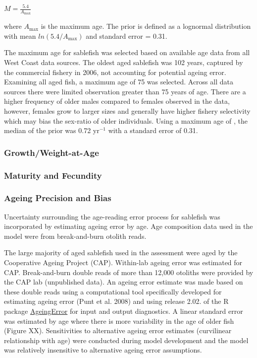 \documentclass[
]{scrartcl}
\begin{document}
\begin{centering}

$M=\frac{5.4}{A_{\text{max}}}$

\end{centering}

\vspace{0.5cm}

where \(A_{\text{max}}\) is the maximum age. The prior is defined as a
lognormal distribution with mean \(ln(5.4/A_{\text{max}})\) and standard
error = 0.31.

The maximum age for sablefish was selected based on available age data
from all West Coast data sources. The oldest aged sablefish was 102
years, captured by the commercial fishery in 2006, not accounting for
potential ageing error. Examining all aged fish, a maximum age of 75 was
selected. Across all data sources there were limited observation greater
than 75 years of age. There are a higher frequency of older males
compared to females observed in the data, however, females grow to
larger sizes and generally have higher fishery selectivity which may
bias the sex-ratio of older individuals. Using a maximum age of , the
median of the prior was 0.72 yr\(^{-1}\) with a standard error of 0.31.

\subsubsection{Growth/Weight-at-Age}\label{growthweight-at-age}

\subsubsection{Maturity and Fecundity}\label{maturity-and-fecundity}

\subsubsection{Ageing Precision and
Bias}\label{ageing-precision-and-bias}

Uncertainty surrounding the age-reading error process for sablefish was
incorporated by estimating ageing error by age. Age composition data
used in the model were from break-and-burn otolith reads.

The large majority of aged sablefish used in the assessment were aged by
the Cooperative Ageing Project (CAP). Within-lab ageing error was
estimated for CAP. Break-and-burn double reads of more than 12,000
otoliths were provided by the CAP lab (unpublished data). An ageing
error estimate was made based on these double reads using a
computational tool specifically developed for estimating ageing error
(Punt et al. 2008) and using release 2.02. of the R package
\href{https://github.com/nwfsc-assess/nwfscAgeingError}{AgeingError} for
input and output diagnostics. A linear standard error was estimated by
age where there is more variability in the age of older fish (Figure
XX). Sensitivities to alternative ageing error estimates (curvilinear
relationship with age) were conducted during model development and the
model was relatively insensitive to alternative ageing error
assumptions.
\end{document}
